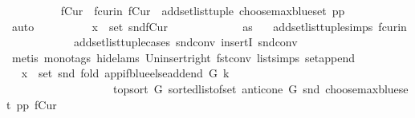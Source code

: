 \begin{isabellebody}
\ \ \ \ \ \ \ \ \isamarkupfalse%
\ fCur\ \ fcur{\isacharunderscore}{\kern0pt}in{\isacharcolon}{\kern0pt}\ {\isachardoublequoteopen}fCur\ {\isacharequal}{\kern0pt}\ add{\isacharunderscore}{\kern0pt}set{\isacharunderscore}{\kern0pt}list{\isacharunderscore}{\kern0pt}tuple\ {\isacharparenleft}{\kern0pt}choose{\isacharunderscore}{\kern0pt}max{\isacharunderscore}{\kern0pt}blue{\isacharunderscore}{\kern0pt}set\ pp{\isacharparenright}{\kern0pt}{\isachardoublequoteclose}\isanewline
\ \ \ \ \ \ \ \ \ \ \isamarkupfalse%
\ auto\isanewline
\ \ \ \ \ \ \ \ \isamarkupfalse%
\ {\isachardoublequoteopen}x\ {\isasymin}\ set\ {\isacharparenleft}{\kern0pt}snd{\isacharparenleft}{\kern0pt}fCur{\isacharparenright}{\kern0pt}{\isacharparenright}{\kern0pt}{\isachardoublequoteclose}\ \isanewline
\ \ \ \ \ \ \ \ \ \ \isamarkupfalse%
\ as{}\ \isamarkupfalse%
\ \ add{\isacharunderscore}{\kern0pt}set{\isacharunderscore}{\kern0pt}list{\isacharunderscore}{\kern0pt}tuple{\isachardot}{\kern0pt}simps\ fcur{\isacharunderscore}{\kern0pt}in\isanewline
\ \ \ \ \ \ \ \ \ \ \ \ add{\isacharunderscore}{\kern0pt}set{\isacharunderscore}{\kern0pt}list{\isacharunderscore}{\kern0pt}tuple{\isachardot}{\kern0pt}cases\ snd{\isacharunderscore}{\kern0pt}conv\ insertI{}\ snd{\isacharunderscore}{\kern0pt}conv\isanewline
\ \ \ \ \ \ \ \ \ \ \isamarkupfalse%
\ {\isacharparenleft}{\kern0pt}metis\ {\isacharparenleft}{\kern0pt}mono{\isacharunderscore}{\kern0pt}tags{\isacharcomma}{\kern0pt}\ hide{\isacharunderscore}{\kern0pt}lams{\isacharparenright}{\kern0pt}\ Un{\isacharunderscore}{\kern0pt}insert{\isacharunderscore}{\kern0pt}right\ fst{\isacharunderscore}{\kern0pt}conv\ list{\isachardot}{\kern0pt}simps{\isacharparenleft}{\kern0pt}{}{}{\isacharparenright}{\kern0pt}\ set{\isacharunderscore}{\kern0pt}append{\isacharparenright}{\kern0pt}\ \isanewline
\ \ \ \ \ \ \ \ \isamarkupfalse%
\ \isamarkupfalse%
\ {\isachardoublequoteopen}x\ {\isasymin}\ set\ {\isacharparenleft}{\kern0pt}snd\ {\isacharparenleft}{\kern0pt}fold\ {\isacharparenleft}{\kern0pt}app{\isacharunderscore}{\kern0pt}if{\isacharunderscore}{\kern0pt}blue{\isacharunderscore}{\kern0pt}else{\isacharunderscore}{\kern0pt}add{\isacharunderscore}{\kern0pt}end\ G\ k{\isacharparenright}{\kern0pt}\isanewline
\ \ \ \ \ \ \ \ \ \ \ \ \ \ \ \ \ \ \ {\isacharparenleft}{\kern0pt}top{\isacharunderscore}{\kern0pt}sort\ G\ {\isacharparenleft}{\kern0pt}sorted{\isacharunderscore}{\kern0pt}list{\isacharunderscore}{\kern0pt}of{\isacharunderscore}{\kern0pt}set\ {\isacharparenleft}{\kern0pt}anticone\ G\ {\isacharparenleft}{\kern0pt}snd\ {\isacharparenleft}{\kern0pt}choose{\isacharunderscore}{\kern0pt}max{\isacharunderscore}{\kern0pt}blue{\isacharunderscore}{\kern0pt}set\ pp{\isacharparenright}{\kern0pt}{\isacharparenright}{\kern0pt}{\isacharparenright}{\kern0pt}{\isacharparenright}{\kern0pt}{\isacharparenright}{\kern0pt}\ {\isacharparenleft}{\kern0pt}fCur{\isacharparenright}{\kern0pt}{\isacharparenright}{\kern0pt}{\isacharparenright}{\kern0pt}{\isachardoublequoteclose}\isanewline

\end{isabellebody}
